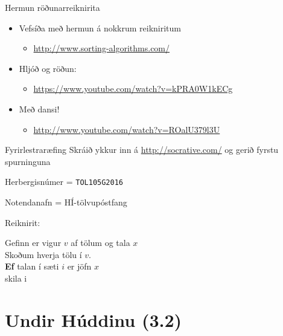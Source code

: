 \documentclass[handout]{beamer}
\begin{document}
\begin{frame}{Hermun röðunarreiknirita}
\begin{itemize}
 \item Vefsíða með hermun á nokkrum reikniritum
 \begin{itemize}
  \item \url{http://www.sorting-algorithms.com/}
 \end{itemize}
 \item Hljóð og röðun:
 \begin{itemize}
  \item \url{https://www.youtube.com/watch?v=kPRA0W1kECg}
 \end{itemize}
 \item Með dansi!
 \begin{itemize}
  \item \url{http://www.youtube.com/watch?v=ROalU379l3U}
 \end{itemize}
\end{itemize}
\end{frame}

\begin{frame}{Fyrirlestraræfing}
Skráið ykkur inn á \url{http://socrative.com/} og gerið fyrstu spurninguna

Herbergisnúmer = \texttt{TOL105G2016}

Notendanafn = HÍ-tölvupóstfang

Reiknirit:

\vspace{0.5cm}
 Gefinn er vigur $v$ af tölum og tala $x$\\
 Skoðum hverja tölu í $v$.\\
 \textbf{Ef} talan í sæti $i$ er jöfn $x$\\
 \quad skila i
\end{frame}

\section{Undir Húddinu (3.2)}
\end{document}

